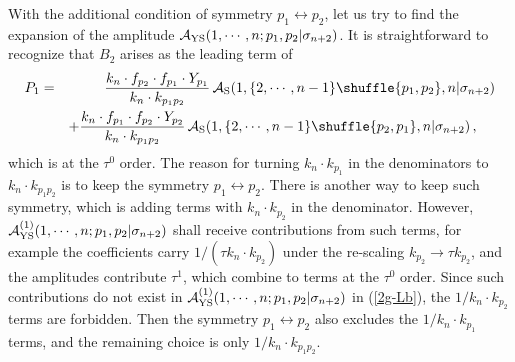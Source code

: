 \documentclass[11pt,a4paper]{article}
\newcommand{\bea}{\begin{eqnarray}}
\newcommand{\eea}{\end{eqnarray}}
\newcommand{\nn}{\nonumber \\}
\def\eref#1{(\ref{#1})}
\begin{document}
With the additional condition of symmetry $p_1\leftrightarrow p_2$, let us try to find the expansion of the amplitude ${\cal A}_{\rm YS}(1,\cdots,n;p_1,p_2|\sigma_{n+2})$. It is straightforward to recognize that $B_2$ arises as the leading term of
%
\bea
P_1&=&{k_n\cdot f_{p_2}\cdot f_{p_1}\cdot Y_{p_1}\over k_n\cdot k_{p_1p_2}}\,{\cal A}_{\rm S}(1,\{2,\cdots,n-1\}\shuffle \{p_1,p_2\},n|\sigma_{n+2})\nn
& &+{k_n\cdot f_{p_1}\cdot f_{p_2}\cdot Y_{p_2}\over k_n\cdot k_{p_1p_2}}\,{\cal A}_{\rm S}(1,\{2,\cdots,n-1\}\shuffle \{p_2,p_1\},n|\sigma_{n+2})\,,~~~~\label{2g-P1}
\eea
%
which is at the $\tau^0$ order. The reason for turning $k_n\cdot k_{p_1}$ in the denominators to $k_n\cdot k_{p_1p_2}$ is to keep the symmetry $p_1\leftrightarrow p_2$. There is another way to keep such symmetry, which is adding terms with $k_n\cdot k_{p_2}$ in the denominator. However, ${\cal A}^{(1)}_{\rm YS}(1,\cdots,n;p_1,p_2|\sigma_{n+2})$ shall receive contributions from such terms, for example the coefficients carry $1/(\tau k_n\cdot k_{p_2})$ under the re-scaling $k_{p_2}\to\tau k_{p_2}$, and the amplitudes contribute $\tau^1$, which combine to terms at the $\tau^0$ order. Since such contributions do not exist in ${\cal A}^{(1)}_{\rm YS}(1,\cdots,n;p_1,p_2|\sigma_{n+2})$ in \eref{2g-Lb}, the $1/k_n\cdot k_{p_2}$ terms are forbidden. Then the symmetry $p_1\leftrightarrow p_2$ also excludes the $1/k_n\cdot k_{p_1}$ terms, and the remaining choice is only $1/k_n\cdot k_{p_1p_2}$.
\end{document}
